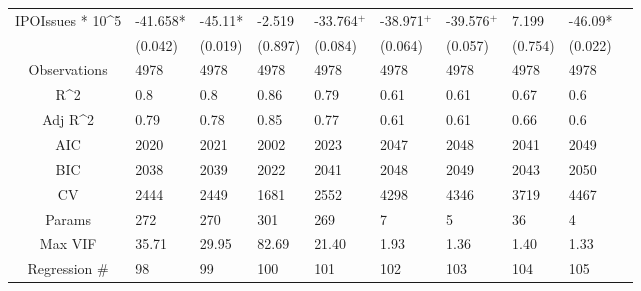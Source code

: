 \documentclass{article}
\begin{document}
\begin{table}[H]
\begin{tabular}{|clllllllll|}
  IPOIssues * 10^5 & -41.658* & -45.11* & -2.519 & -33.764$^{+}$ & -38.971$^{+}$ & -39.576$^{+}$ & 7.199 & -46.09* & \\ 
   & (0.042) & (0.019) & (0.897) & (0.084) & (0.064) & (0.057) & (0.754) & (0.022) & \\ 
  \hline 
 Observations & 4978 & 4978 & 4978 & 4978 & 4978 & 4978 & 4978 & 4978 & \\ 
  R^2 & 0.8 & 0.8 & 0.86 & 0.79 & 0.61 & 0.61 & 0.67 & 0.6 & \\ 
  Adj R^2 & 0.79 & 0.78 & 0.85 & 0.77 & 0.61 & 0.61 & 0.66 & 0.6 & \\ 
  AIC & 2020 & 2021 & 2002 & 2023 & 2047 & 2048 & 2041 & 2049 & \\ 
  BIC & 2038 & 2039 & 2022 & 2041 & 2048 & 2049 & 2043 & 2050 & \\ 
  CV & 2444 & 2449 & 1681 & 2552 & 4298 & 4346 & 3719 & 4467 & \\ 
  Params & 272 & 270 & 301 & 269 & 7 & 5 & 36 & 4 & \\ 
  Max VIF & 35.71 & 29.95 & 82.69 & 21.40 & 1.93 & 1.36 & 1.40 & 1.33 & \\ 
  Regression \# & 98 & 99 & 100 & 101 & 102 & 103 & 104 & 105 & \\ 
   \hline
\end{tabular}
 
\end{table}
\end{document}
